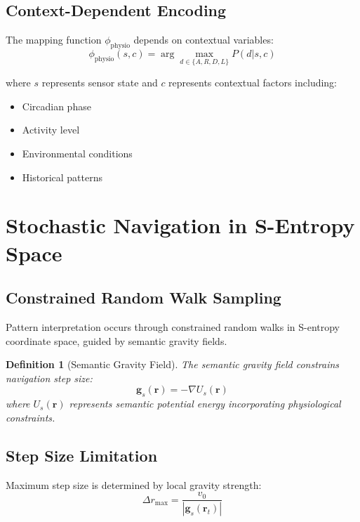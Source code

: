 \documentclass[12pt,a4paper]{article}
\newtheorem{definition}{Definition}
\begin{document}
\subsection{Context-Dependent Encoding}

The mapping function $\phi_{\text{physio}}$ depends on contextual variables:
\begin{equation}
\phi_{\text{physio}}(s, c) = \arg\max_{d \in \{A,R,D,L\}} P(d|s, c)
\end{equation}

where $s$ represents sensor state and $c$ represents contextual factors including:
\begin{itemize}
\item Circadian phase
\item Activity level
\item Environmental conditions
\item Historical patterns
\end{itemize}

\section{Stochastic Navigation in S-Entropy Space}

\subsection{Constrained Random Walk Sampling}

Pattern interpretation occurs through constrained random walks in S-entropy coordinate space, guided by semantic gravity fields.

\begin{definition}[Semantic Gravity Field]
The semantic gravity field constrains navigation step size:
\begin{equation}
\mathbf{g}_s(\mathbf{r}) = -\nabla U_s(\mathbf{r})
\end{equation}
where $U_s(\mathbf{r})$ represents semantic potential energy incorporating physiological constraints.
\end{definition}

\subsection{Step Size Limitation}

Maximum step size is determined by local gravity strength:
\begin{equation}
\Delta r_{\max} = \frac{v_0}{|\mathbf{g}_s(\mathbf{r}_t)|}
\end{equation}
\end{document}

